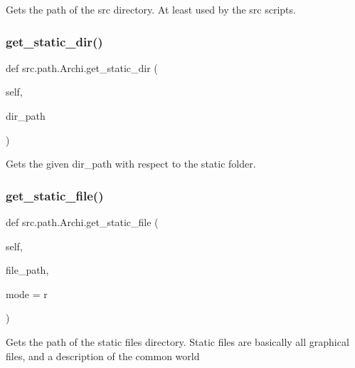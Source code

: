 \begin{DoxyVerb}Gets the path of the src directory.
At least used by the src scripts.
\end{DoxyVerb}
 \hypertarget{classsrc_1_1path_1_1_archi_acb1d85cb548817e809d190c6a0ff1298}{}\label{classsrc_1_1path_1_1_archi_acb1d85cb548817e809d190c6a0ff1298} 
\subsubsection{\texorpdfstring{get\+\_\+static\+\_\+dir()}{get\_static\_dir()}}
{\footnotesize\ttfamily def src.\+path.\+Archi.\+get\+\_\+static\+\_\+dir (\begin{DoxyParamCaption}\item[{}]{self,  }\item[{}]{dir\+\_\+path }\end{DoxyParamCaption})}

\begin{DoxyVerb}Gets the given dir_path with respect to the static folder.
\end{DoxyVerb}
 \hypertarget{classsrc_1_1path_1_1_archi_a163cd2e27a1fb14756a4000292445411}{}\label{classsrc_1_1path_1_1_archi_a163cd2e27a1fb14756a4000292445411} 
\subsubsection{\texorpdfstring{get\+\_\+static\+\_\+file()}{get\_static\_file()}}
{\footnotesize\ttfamily def src.\+path.\+Archi.\+get\+\_\+static\+\_\+file (\begin{DoxyParamCaption}\item[{}]{self,  }\item[{}]{file\+\_\+path,  }\item[{}]{mode = {\ttfamily \textquotesingle{}r\textquotesingle{}} }\end{DoxyParamCaption})}

\begin{DoxyVerb}Gets the path of the static files directory.  Static files are
basically all graphical files, and a description of the common world
\end{DoxyVerb}
 \hypertarget{classsrc_1_1path_1_1_archi_a280bc53aa0db4662ffd7a9e5938c597d}{}\label{classsrc_1_1path_1_1_archi_a280bc53aa0db4662ffd7a9e5938c597d} 
